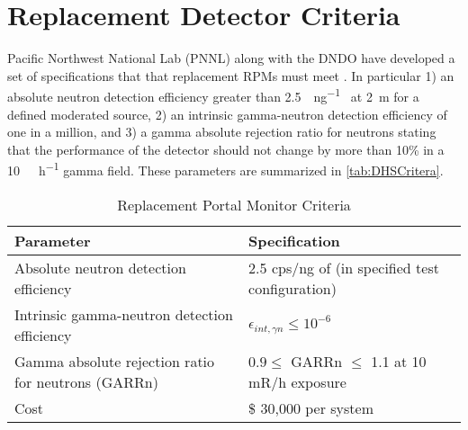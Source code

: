 \section{Replacement Detector Criteria}
\label{sec:ReplacmentCriteria}
Pacific Northwest National Lab (PNNL) along with the DNDO have developed a set of specifications that that replacement RPMs must meet \cite{kouzes_neutron_2010, kouzes_neutron_1999}. 
In particular 1) an absolute neutron detection efficiency greater than \SI{2.5}{\cps\per\ng {}} at \SI{2}{\meter} for a defined moderated  source, 2) an intrinsic gamma-neutron detection efficiency of one in a million, and 3) a gamma absolute rejection ratio for neutrons stating that the performance of the detector should not change by more than 10\% in a \SI{10}{\milli\roetgen\per\hour} gamma field.
These parameters are summarized in \autoref{tab:DHSCritera}.
\begin{table}
  \centering
	\caption{Replacement Portal Monitor Criteria}
	\begin{tabular}{m{8cm} m{6cm} }
	Parameter & Specification \\
	\hline
	\hline
	Absolute neutron detection efficiency & 2.5 cps/ng of \iso[252]{Cf} (in specified test configuration) \\
	Intrinsic gamma-neutron detection efficiency & $ \epsilon_{int,\gamma n}\leq 10^{-6}$ \\
	Gamma absolute rejection ratio for neutrons (GARRn) & $ 0.9 \leq \text{ GARRn }\leq$ 1.1 at 10 mR/h exposure \\
	Cost &  \$ 30,000 per system \\
	\end{tabular}
	\label{tab:DHSCritera}
\end{table}

